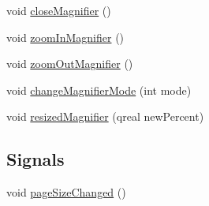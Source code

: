 \begin{DoxyCompactItemize}
\item 
void \hyperlink{class_u_b_graphics_scene_acde00412f74076075aa080093588b308}{close\-Magnifier} ()
\item 
void \hyperlink{class_u_b_graphics_scene_aeddbb21827440839eab75eb9f01a7647}{zoom\-In\-Magnifier} ()
\item 
void \hyperlink{class_u_b_graphics_scene_a7cd496f1aae3c1ab0f372fa2e9a75370}{zoom\-Out\-Magnifier} ()
\item 
void \hyperlink{class_u_b_graphics_scene_aacb578d05b2d7fe372556ebdd4061029}{change\-Magnifier\-Mode} (int mode)
\item 
void \hyperlink{class_u_b_graphics_scene_a8bded4f617b9d1d9cbd10e1b4c7545bf}{resized\-Magnifier} (qreal new\-Percent)
\end{DoxyCompactItemize}
\subsection*{Signals}
\begin{DoxyCompactItemize}
\item 
void \hyperlink{class_u_b_graphics_scene_a83c404a044e0e608b63b998751af645d}{page\-Size\-Changed} ()
\end{DoxyCompactItemize}

